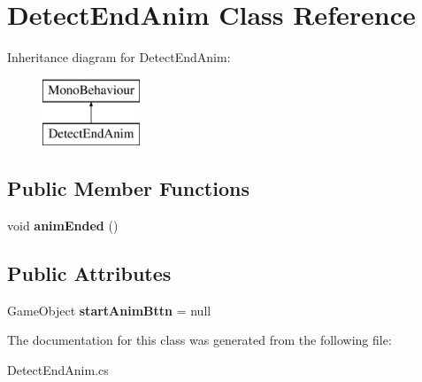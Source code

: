 \hypertarget{class_detect_end_anim}{}\section{Detect\+End\+Anim Class Reference}
\label{class_detect_end_anim}
Inheritance diagram for Detect\+End\+Anim\+:\begin{figure}[H]
\begin{center}
\leavevmode
\includegraphics[height=2.000000cm]{class_detect_end_anim}
\end{center}
\end{figure}
\subsection*{Public Member Functions}
\begin{DoxyCompactItemize}
\item 
\mbox{\label{class_detect_end_anim_a3214b4b28520b3d0f1316d3aad54b581}} 
void {\bfseries anim\+Ended} ()
\end{DoxyCompactItemize}
\subsection*{Public Attributes}
\begin{DoxyCompactItemize}
\item 
\mbox{\label{class_detect_end_anim_a280dbf8134eb19d6f9dd30af4375c832}} 
Game\+Object {\bfseries start\+Anim\+Bttn} = null
\end{DoxyCompactItemize}


The documentation for this class was generated from the following file\+:\begin{DoxyCompactItemize}
\item 
Detect\+End\+Anim.\+cs\end{DoxyCompactItemize}

